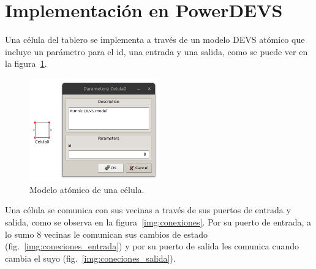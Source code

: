 \documentclass[12pt]{article}
\begin{document}
\section{Implementación en PowerDEVS}


Una célula del tablero se implementa a través de un modelo DEVS atómico que incluye un parámetro para el id, una entrada y una salida, como se puede ver en la figura~\ref{img:celula}.

\begin{figure}[ht]
  \centering
  \includegraphics[width=0.5\textwidth]{imagenes/celula.png}
  \caption{Modelo atómico de una célula.}\label{img:celula}
\end{figure}

Una célula se comunica con sus vecinas a través de sus puertos de entrada y salida, como se observa en la figura~\ref{img:conexiones}. Por su puerto de entrada, a lo sumo 8 vecinas le comunican sus cambios de estado (fig.~\ref{img:coneciones_entrada}) y por su puerto de salida les comunica cuando cambia el suyo (fig.~\ref{img:coneciones_salida}).
\end{document}
